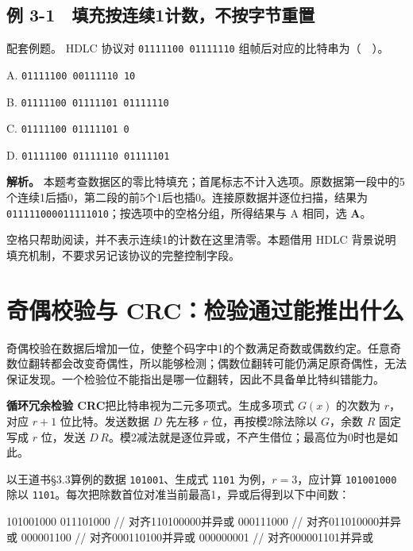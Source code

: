 \subsection{例 3-1　填充按连续1计数，不按字节重置}\label{CN03-ex1}

{\begin{example}[配套例题]

配套例题。 HDLC 协议对 \texttt{01111100 01111110} 组帧后对应的比特串为（　）。

A. \texttt{01111100 00111110 10}

B. \texttt{01111100 01111101 01111110}

C. \texttt{01111100 01111101 0}

D. \texttt{01111100 01111110 01111101}

\end{example}}

\textbf{解析。} 本题考查数据区的零比特填充；首尾标志不计入选项。原数据第一段中的5个连续1后插0，第二段的前5个1后也插0。连接原数据并逐位扫描，结果为 \texttt{011111000011111010}；按选项中的空格分组，所得结果与 A 相同，选 \textbf{A}。

空格只帮助阅读，并不表示连续1的计数在这里清零。本题借用 HDLC 背景说明填充机制，不要求另记该协议的完整控制字段。

\section{奇偶校验与 CRC：检验通过能推出什么}\label{CN03-03}

奇偶校验在数据后增加一位，使整个码字中1的个数满足奇数或偶数约定。任意奇数位翻转都会改变奇偶性，所以能够检测；偶数位翻转可能仍满足原奇偶性，无法保证发现。一个检验位不能指出是哪一位翻转，因此不具备单比特纠错能力。

\textbf{循环冗余检验 CRC}把比特串视为二元多项式。生成多项式 \(G(x)\) 的次数为 \(r\)，对应 \(r+1\) 位比特。发送数据 \(D\) 先左移 \(r\) 位，再按模2除法除以 \(G\)，余数 \(R\) 固定写成 \(r\) 位，发送 \(D\,R\)。模2减法就是逐位异或，不产生借位；最高位为0时也是如此。

以王道书§3.3算例的数据 \texttt{101001}、生成式 \texttt{1101} 为例，\(r=3\)，应计算 \texttt{101001000} 除以 \texttt{1101}。每次把除数首位对准当前最高1，异或后得到以下中间数：

\begin{codeblock}[language={}]
101001000
011101000  // 对齐110100000并异或
000111000  // 对齐011010000并异或
000001100  // 对齐000110100并异或
000000001  // 对齐000001101并异或
\end{codeblock}

